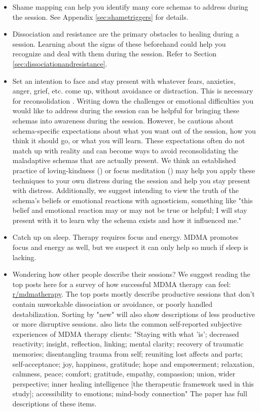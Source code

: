 \documentclass[12pt,letterpaper]{book}
\begin{document}
\begin{itemize}
    \item Shame mapping can help you identify many core schemas to address during the session. See Appendix \ref{sec:shametriggers} for details.
    \item Dissociation and resistance are the primary obstacles to healing during a session. Learning about the signs of these beforehand could help you recognize and deal with them during the session. Refer to Section \ref{sec:dissociationandresistance}.
    \item Set an intention to face and stay present with whatever fears, anxieties, anger, grief, etc. come up, without avoidance or distraction. This is necessary for reconsolidation \cite{eckerUnlocking}. Writing down the challenges or emotional difficulties you would like to address during the session can be helpful for bringing these schemas into awareness during the session. However, be cautious about schema-specific expectations about what you want out of the session, how you think it should go, or what you will learn. These expectations often do not match up with reality and can become ways to avoid reconsolidating the maladaptive schemas that are actually present. We think an established practice of loving-kindness (\textcite{lkMeditation}) or focus meditation (\textcite{rain}) may help you apply these techniques to your own distress during the session and help you stay present with distress. Additionally, we suggest intending to view the truth of the schema's beliefs or emotional reactions with agnosticism, something like "this belief and emotional reaction may or may not be true or helpful; I will stay present with it to learn why the schema exists and how it influenced me."
    \item Catch up on sleep. Therapy requires focus and energy. MDMA promotes focus and energy as well, but we suspect it can only help so much if sleep is lacking.
    \item Wondering how other people describe their sessions? We suggest reading the top posts here for a survey of how successful MDMA therapy can feel: \href{https://old.reddit.com/r/mdmatherapy/top/?sort=top&t=all}{r/mdmatherapy}. The top posts mostly describe productive sessions that don't contain unworkable dissociation or avoidance, or poorly handled destabilization. Sorting by "new" will also show descriptions of less productive or more disruptive sessions. \textcite{godes2023perceived} also lists the common self-reported subjective experiences of MDMA therapy clients: "Staying with what 'is'; decreased reactivity; insight, reflection, linking; mental clarity; recovery of traumatic memories; disentangling trauma from self; reuniting lost affects and parts; self-acceptance; joy, happiness, gratitude; hope and empowerment; relaxation, calmness, peace; comfort; gratitude, empathy, compassion; union, wider perspective; inner healing intelligence [the therapeutic framework used in this study]; accessibility to emotions; mind-body connection" The paper has full descriptions of these items.
\end{itemize}
\end{document}
